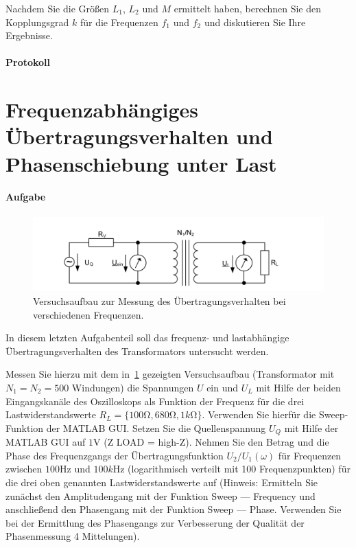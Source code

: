 \documentclass[10pt]{scrreprt}
\begin{document}
        Nachdem Sie die Größen $L_1$, $L_2$ und $M$ ermittelt haben, berechnen Sie den Kopplungsgrad
        $k$ für die Frequenzen $f_1$ und $f_2$ und diskutieren Sie Ihre Ergebnisse.

        \paragraph{Protokoll}

        \section{Frequenzabhängiges Übertragungsverhalten und Phasenschiebung unter Last}
        \paragraph{Aufgabe}
        \begin{center}
            \begin{figure}[H]
                \includegraphics[width=\textwidth]{aufgabenBilder/abbildung12.png}
                \caption{Versuchsaufbau zur Messung des Übertragungsverhalten bei verschiedenen Frequenzen.}
                \label{fig:abb12}
            \end{figure}
        \end{center}

        In diesem letzten Aufgabenteil soll das frequenz- und lastabhängige Übertragungsverhalten
        des Transformators untersucht werden.

        \vspace{0.5cm}

        Messen Sie hierzu mit dem in~\ref{fig:abb12} gezeigten Versuchsaufbau (Transformator mit
        $N_1 = N_2 = 500$ Windungen) die Spannungen $U$ ein und $U_L$ mit Hilfe der beiden Eingangskanäle
        des Oszilloskops als Funktion der Frequenz für die drei Lastwiderstandswerte
        $R_L = \{100\si{\ohm}, 680 \si{\ohm}, 1 \si{k\ohm}\}$. Verwenden Sie hierfür die Sweep-Funktion der MATLAB GUI.
        Setzen Sie die Quellenspannung $U_Q$ mit Hilfe der MATLAB GUI auf $1\si{\volt}$ (Z LOAD = high-Z).
        Nehmen Sie den Betrag und die Phase des Frequenzgangs der Übertragungsfunktion
        $U_2 /U_1 (\omega)$ für Frequenzen zwischen $100\si{\hertz}$ und $100\si{k\hertz}$ (logarithmisch verteilt mit 100
        Frequenzpunkten) für die drei oben genannten Lastwiderstandswerte auf (Hinweis:
        Ermitteln Sie zunächst den Amplitudengang mit der Funktion \glqq{}Sweep --- Frequency\grqq{} und
        anschließend den Phasengang mit der Funktion \glqq{}Sweep --- Phase\grqq{}. Verwenden Sie bei der
        Ermittlung des Phasengangs zur Verbesserung der Qualität der Phasenmessung 4 Mittelungen).
\end{document}
